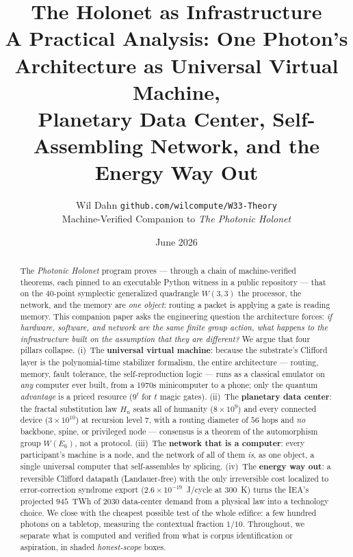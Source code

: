\documentclass[11pt]{article}
\title{\vspace{-1.5em}\textbf{\color{RoyalBlue}\Huge The Holonet as Infrastructure}\\[0.4em]
{\large A Practical Analysis: One Photon's Architecture as Universal Virtual Machine,\\
Planetary Data Center, Self-Assembling Network, and the Energy Way Out}}
\author{Wil Dahn \quad\textbar\quad \texttt{github.com/wilcompute/W33-Theory}\\
{\small Machine-Verified Companion to \emph{The Photonic Holonet}}}
\date{June 2026}
\begin{document}
\maketitle

\begin{abstract}
\noindent The \emph{Photonic Holonet} program proves --- through a chain of machine-verified theorems,
each pinned to an executable Python witness in a public repository --- that on the $40$-point symplectic
generalized quadrangle $W(3,3)$ the processor, the network, and the memory are \emph{one object}:
routing a packet is applying a gate is reading memory. This companion paper asks the engineering
question the architecture forces: \emph{if hardware, software, and network are the same finite group
action, what happens to the infrastructure built on the assumption that they are different?} We argue
that four pillars collapse. (i)~The \textbf{universal virtual machine}: because the substrate's
Clifford layer is the polynomial-time stabilizer formalism, the entire architecture --- routing,
memory, fault tolerance, the self-reproduction logic --- runs as a classical emulator on \emph{any}
computer ever built, from a 1970s minicomputer to a phone; only the quantum \emph{advantage} is a
priced resource ($9^{t}$ for $t$ magic gates). (ii)~The \textbf{planetary data center}: the fractal
substitution law $H_n$ seats all of humanity ($8\times10^9$) and every connected device
($3\times10^{10}$) at recursion level $7$, with a routing diameter of $56$ hops and \emph{no} backbone,
spine, or privileged node --- consensus is a theorem of the automorphism group $W(E_6)$, not a
protocol. (iii)~The \textbf{network that is a computer}: every participant's machine is a node, and the
network of all of them \emph{is}, as one object, a single universal computer that self-assembles by
splicing. (iv)~The \textbf{energy way out}: a reversible Clifford datapath (Landauer-free) with the
only irreversible cost localized to error-correction syndrome export ($2.6\times10^{-19}$~J/cycle at
$300$~K) turns the IEA's projected $945$~TWh of 2030 data-center demand from a physical law into a
technology choice. We close with the cheapest possible test of the whole edifice: a few hundred photons
on a tabletop, measuring the contextual fraction $1/10$. Throughout, we separate what is computed and
verified from what is corpus identification or aspiration, in shaded \emph{honest-scope} boxes.
\end{abstract}
\end{document}
